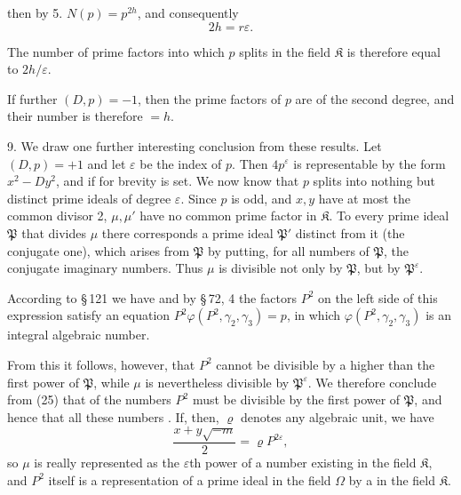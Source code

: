 then by 5. $N(p) = p^{2h}$, and consequently
\[
2h = r\varepsilon.
\]

The number of prime factors into which $p$ splits in the field $\mathfrak{K}$
is therefore equal to $2h/\varepsilon$.

If further $(D, p) = -1$, then the prime factors of $p$ are of the second degree, and their number is therefore $= h$.

9. We draw one further interesting conclusion from these results. Let $(D, p) = +1$ and let $\varepsilon$ be the index of $p$. Then $4p^{\varepsilon}$ is representable by the form $x^2 - Dy^2$, and
if for brevity
is set. We now know that $p$ splits into nothing but distinct prime ideals of degree $\varepsilon$. Since $p$ is odd, and $x, y$ have at most the common divisor 2, $\mu, \mu'$ have no common prime factor in $\mathfrak{K}$. To every prime ideal $\mathfrak{P}$ that divides $\mu$ there corresponds a prime ideal $\mathfrak{P}'$ distinct from it (the conjugate one), which arises from $\mathfrak{P}$ by putting, for all numbers of $\mathfrak{P}$, the conjugate imaginary numbers. Thus $\mu$ is divisible not only by $\mathfrak{P}$, but by $\mathfrak{P}^{\varepsilon}$.

According to \S\,121 we have
and by \S\,72, 4 the factors $P^2$ on the left side of this expression satisfy an equation $P^2\varphi(P^2, \gamma_2, \gamma_3) = p$, in which $\varphi(P^2, \gamma_2, \gamma_3)$ is an integral algebraic number.

From this it follows, however, that $P^2$ cannot be divisible by a higher than the first power of $\mathfrak{P}$, while $\mu$ is nevertheless divisible by $\mathfrak{P}^{\varepsilon}$. We therefore conclude from (25) that  of the numbers $P^2$ must be divisible by the first power of $\mathfrak{P}$, and hence that all these numbers . If, then, $\varrho$ denotes any algebraic unit, we have
\[
\frac{x + y\sqrt{-m}}{2} = \varrho P^{2\varepsilon},
\]
so $\mu$ is really represented as the $\varepsilon$th power of a number existing in the field $\mathfrak{K}$, and $P^2$ itself is a representation of a prime ideal in the field $\Omega$ by a  in the field $\mathfrak{K}$.
